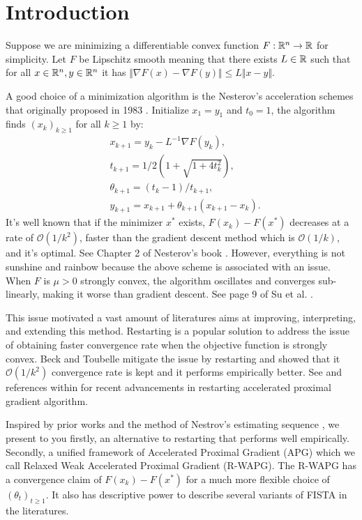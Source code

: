 \documentclass[12pt]{article}
\begin{document}
\section{Introduction}
    Suppose we are minimizing a differentiable convex function $F: \mathbb R^n \rightarrow \mathbb R$ for simplicity. 
    Let $F$ be Lipschitz smooth meaning that there exists $L \in \mathbb R$ such that for all $x \in \mathbb R^n, y\in \mathbb R^n$ it has $\Vert \nabla F(x) - \nabla F(y)\Vert \le L \Vert x - y \Vert$. 
    \par 
    A good choice of a minimization algorithm is the Nesterov's acceleration schemes that originally proposed in 1983 \cite{nesterov_method_1983}. Initialize $x_1 = y_1$ and $t_0 = 1$, the algorithm finds $(x_k)_{k \ge 1}$ for all $k \ge 1$ by: 
    \begin{align}
        & x_{k + 1} = y_k - L^{-1}\nabla F(y_k), 
        \\
        & t_{k + 1} = 1/2\left(1 + \sqrt{1 + 4t_{k}^2}\right), 
        \\
        & \theta_{k + 1} = (t_{k} - 1)/t_{k + 1}, 
        \\
        & y_{k + 1} = x_{k + 1} + \theta_{k + 1}(x_{k + 1} - x_k). 
    \end{align}\label{eqn:example_algorithm}
    It's well known that if the minimizer $x^*$ exists, $F(x_k) - F(x^*)$ decreases at a rate of $\mathcal O(1/k^2)$, faster than the gradient descent method which is $\mathcal O(1/k)$, and it's optimal. 
    See Chapter 2 of Nesterov's book \cite{nesterov_lectures_2018}. 
    However, everything is not sunshine and rainbow because the above scheme is associated with an issue. 
    When $F$ is $\mu > 0$ strongly convex, the algorithm oscillates and converges sub-linearly, making it worse than gradient descent. See page 9 of Su et al. \cite{su_differential_2016}. 
    \par
    This issue motivated a vast amount of literatures aims at improving, interpreting, and extending this method. 
    Restarting is a popular solution to address the issue of obtaining faster convergence rate when the objective function is strongly convex. 
    Beck and Toubelle \cite{beck_fast_2009} mitigate the issue by restarting and showed that it $\mathcal O(1/k^2)$ convergence rate is kept and it performs empirically better. 
    See \cite{necoara_linear_2019}\cite{aujol_parameter-free_2024} and references within for recent advancements in restarting accelerated proximal gradient algorithm. 
    \par
    Inspired by prior works and the method of Nestrov's estimating sequence \cite{nesterov_lectures_2018}, we present to you firstly, an alternative to restarting that performs well empirically. 
    Secondly, a unified framework of Accelerated Proximal Gradient (APG) which we call Relaxed Weak Accelerated Proximal Gradient (R-WAPG). 
    The R-WAPG has a convergence claim of $F(x_k)- F(x^*)$ for a much more flexible choice of $(\theta_t)_{t \ge 1}$. 
    It also has descriptive power to describe several variants of FISTA in the literatures.  
\end{document}
